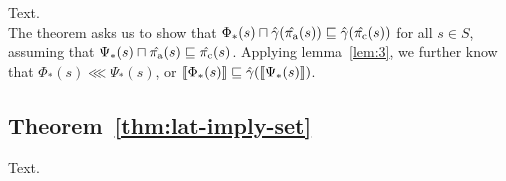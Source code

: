 Text.
\\

The theorem asks us to show that $\Phi_{*}(s) \sqcap \hat{\gamma}(\hat{\operatorname{\pi_{\textrm{a}}}}(s)) \sqsubseteq \hat{\gamma}(\hat{\operatorname{\pi_{\textrm{c}}}}(s))$ for all $s \in S$, assuming that $\Psi_{*}(s) \sqcap \hat{\operatorname{\pi_{\textrm{a}}}}(s) \sqsubseteq \hat{\operatorname{\pi_{\textrm{c}}}}(s)$. Applying lemma~\ref{lem:3}, we further know that $\Phi_{*}(s) \lll \Psi_{*}(s)$, or $\llbracket \Phi_{*}(s) \rrbracket \sqsubseteq \hat{\gamma}(\llbracket \Psi_{*}(s) \rrbracket)$.

\subsection{Theorem~\ref{thm:lat-imply-set}}

Text.
